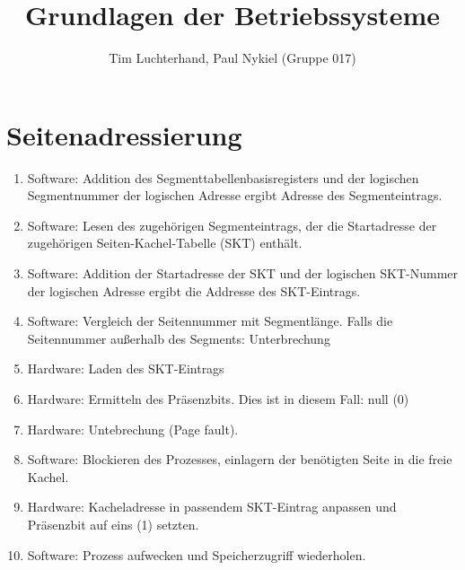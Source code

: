 \documentclass[DIN, pagenumber=false, fontsize=11pt, parskip=half]{scrartcl}
\title{Grundlagen der Betriebssysteme}
\author{Tim Luchterhand, Paul Nykiel (Gruppe 017)}
\begin{document}
    \maketitle
    \section{Seitenadressierung}
    \begin{enumerate}
        \item Software: Addition des Segmenttabellenbasisregisters und der logischen Segmentnummer der logischen Adresse
            ergibt Adresse des Segmenteintrags.
        \item Software: Lesen des zugehörigen Segmenteintrags, der die Startadresse der zugehörigen Seiten-Kachel-Tabelle
            (SKT) enthält.
        \item Software: Addition der Startadresse der SKT und der logischen SKT-Nummer der logischen Adresse ergibt die Addresse des SKT-Eintrags.
        \item Software: Vergleich der Seitennummer mit Segmentlänge. Falls die Seitennummer außerhalb des Segments: Unterbrechung
        \item Hardware: Laden des SKT-Eintrags
        \item Hardware: Ermitteln des Präsenzbits. Dies ist in diesem Fall: null (0)
        \item Hardware: Untebrechung (Page fault).
        \item Software: Blockieren des Prozesses, einlagern der benötigten Seite in die freie Kachel.
        \item Hardware: Kacheladresse in passendem SKT-Eintrag anpassen und Präsenzbit auf eins (1) setzten.
        \item Software: Prozess aufwecken und Speicherzugriff wiederholen.
    \end{enumerate}
\end{document}
